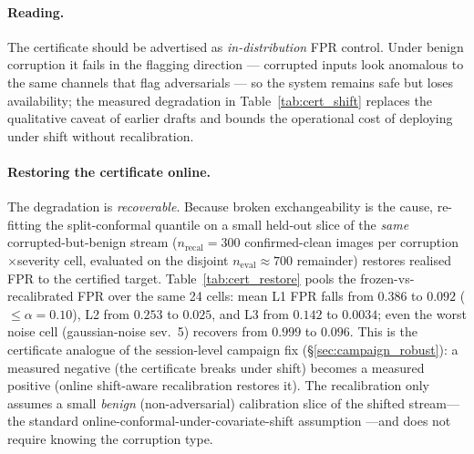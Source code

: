 \paragraph{Reading.} The certificate should be advertised as
\emph{in-distribution} FPR control. Under benign corruption it fails in the
flagging direction --- corrupted inputs look anomalous to the same channels
that flag adversarials --- so the system remains safe but loses availability;
the measured degradation in Table~\ref{tab:cert_shift} replaces the
qualitative caveat of earlier drafts and bounds the operational cost of
deploying \prism under shift without recalibration.

\paragraph{Restoring the certificate online.} The degradation is
\emph{recoverable}. Because broken exchangeability is the cause, re-fitting the
split-conformal quantile on a small held-out slice of the \emph{same}
corrupted-but-benign stream ($n_\text{recal}{=}300$ confirmed-clean images per
corruption$\times$severity cell, evaluated on the disjoint $n_\text{eval}{\approx}700$
remainder) restores realised FPR to the certified target.
Table~\ref{tab:cert_restore} pools the frozen-vs-recalibrated FPR over the same
24 cells: mean L1 FPR falls from $0.386$ to $0.092$ ($\le\alpha{=}0.10$), L2
from $0.253$ to $0.025$, and L3 from $0.142$ to $0.0034$; even the worst noise
cell (gaussian-noise sev.\ 5) recovers from $0.999$ to $0.096$. This is the
certificate analogue of the session-level campaign fix
(\S\ref{sec:campaign_robust}): a measured negative (the certificate breaks
under shift) becomes a measured positive (online shift-aware recalibration
restores it). The recalibration only assumes a small \emph{benign}
(non-adversarial) calibration slice of the shifted stream---the standard
online-conformal-under-covariate-shift assumption
\cite{tibshirani2019conformal}---and does not require knowing the corruption
type.

